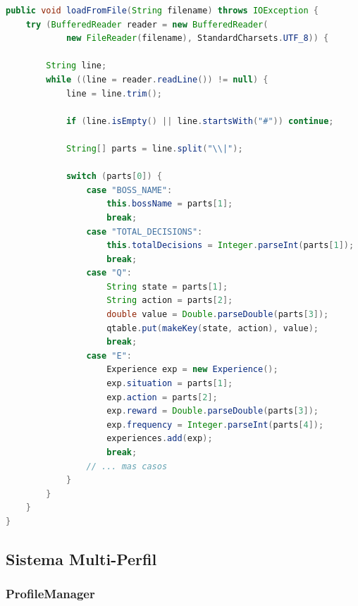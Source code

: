 \documentclass[12pt,a4paper]{article}
\begin{document}
\begin{lstlisting}[language=Java, caption=Carga desde archivo]
public void loadFromFile(String filename) throws IOException {
    try (BufferedReader reader = new BufferedReader(
            new FileReader(filename), StandardCharsets.UTF_8)) {
        
        String line;
        while ((line = reader.readLine()) != null) {
            line = line.trim();
            
            if (line.isEmpty() || line.startsWith("#")) continue;
            
            String[] parts = line.split("\\|");
            
            switch (parts[0]) {
                case "BOSS_NAME":
                    this.bossName = parts[1];
                    break;
                case "TOTAL_DECISIONS":
                    this.totalDecisions = Integer.parseInt(parts[1]);
                    break;
                case "Q":
                    String state = parts[1];
                    String action = parts[2];
                    double value = Double.parseDouble(parts[3]);
                    qtable.put(makeKey(state, action), value);
                    break;
                case "E":
                    Experience exp = new Experience();
                    exp.situation = parts[1];
                    exp.action = parts[2];
                    exp.reward = Double.parseDouble(parts[3]);
                    exp.frequency = Integer.parseInt(parts[4]);
                    experiences.add(exp);
                    break;
                // ... mas casos
            }
        }
    }
}
\end{lstlisting}

\subsection{Sistema Multi-Perfil}

\subsubsection{ProfileManager}
\end{document}
